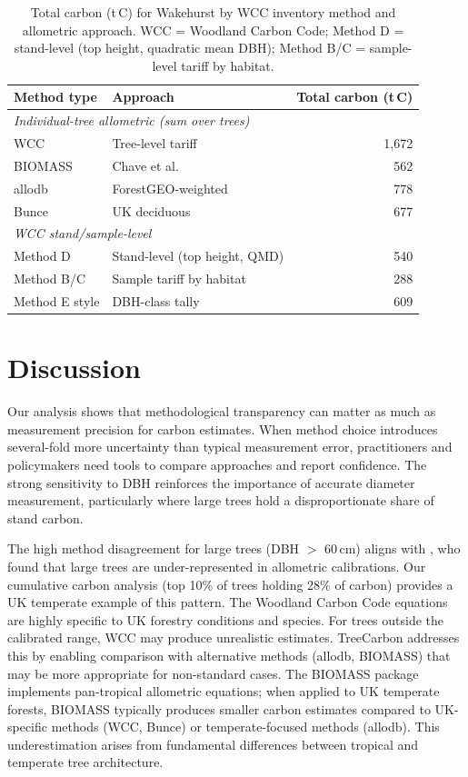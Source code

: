 \documentclass[12pt,a4paper]{article}
\begin{document}
\begin{table}[htbp]
\centering
\caption{Total carbon (t\,C) for Wakehurst by WCC inventory method and allometric approach. WCC = Woodland Carbon Code; Method D = stand-level (top height, quadratic mean DBH); Method B/C = sample-level tariff by habitat.}
\label{tab:wcc-methods}
\small
\begin{tabular}{@{}llr@{}}
\toprule
Method type & Approach & Total carbon (t\,C) \\
\midrule
\multicolumn{3}{l}{\textit{Individual-tree allometric (sum over trees)}} \\
\quad WCC & Tree-level tariff & 1,672 \\
\quad BIOMASS & Chave et al. & 562 \\
\quad allodb & ForestGEO-weighted & 778 \\
\quad Bunce & UK deciduous & 677 \\
\midrule
\multicolumn{3}{l}{\textit{WCC stand/sample-level}} \\
\quad Method D & Stand-level (top height, QMD) & 540 \\
\quad Method B/C & Sample tariff by habitat & 288 \\
\quad Method E style & DBH-class tally & 609 \\
\bottomrule
\end{tabular}
\end{table}

\section{Discussion}

Our analysis shows that methodological transparency can matter as much as measurement precision for carbon estimates. When method choice introduces several-fold more uncertainty than typical measurement error, practitioners and policymakers need tools to compare approaches and report confidence. The strong sensitivity to DBH reinforces the importance of accurate diameter measurement, particularly where large trees hold a disproportionate share of stand carbon.

The high method disagreement for large trees (DBH $>$ 60\,cm) aligns with \citet{Calders2022}, who found that large trees are under-represented in allometric calibrations. Our cumulative carbon analysis (top 10\% of trees holding 28\% of carbon) provides a UK temperate example of this pattern. The Woodland Carbon Code equations are highly specific to UK forestry conditions and species. For trees outside the calibrated range, WCC may produce unrealistic estimates. TreeCarbon addresses this by enabling comparison with alternative methods (allodb, BIOMASS) that may be more appropriate for non-standard cases. The BIOMASS package implements pan-tropical allometric equations; when applied to UK temperate forests, BIOMASS typically produces smaller carbon estimates compared to UK-specific methods (WCC, Bunce) or temperate-focused methods (allodb). This underestimation arises from fundamental differences between tropical and temperate tree architecture.
\end{document}
